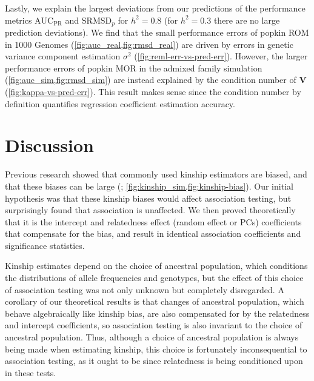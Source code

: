 \documentclass[11pt]{article}
\newcommand{\rmsd}{\text{SRMSD}_p}
\newcommand{\auc}{\text{AUC}_\text{PR}}
\begin{document}
\begin{linenumbers}
Lastly, we explain the largest deviations from our predictions of the performance metrics $\auc$ and $\rmsd$ for $h^2=0.8$ (for $h^2=0.3$ there are no large prediction deviations).
We find that the small performance errors of popkin ROM in 1000 Genomes (\cref{fig:auc_real,fig:rmsd_real}) are driven by errors in genetic variance component estimation $\sigma^2$ (\cref{fig:reml-err-vs-pred-err}).
However, the larger performance errors of popkin MOR in the admixed family simulation (\cref{fig:auc_sim,fig:rmsd_sim}) are instead explained by the condition number of $\mathbf{V}$ (\cref{fig:kappa-vs-pred-err}).
This result makes sense since the condition number by definition quantifies regression coefficient estimation accuracy.

\section{Discussion}

Previous research showed that commonly used kinship estimators are biased, and that these biases can be large (\citet{ochoa_estimating_2021}; \cref{fig:kinship_sim,fig:kinship-bias}).
Our initial hypothesis was that these kinship biases would affect association testing, but surprisingly found that association is unaffected.
We then proved theoretically that it is the intercept and relatedness effect (random effect or PCs) coefficients that compensate for the bias, and result in identical association coefficients and significance statistics.

Kinship estimates depend on the choice of ancestral population, which conditions the distributions of allele frequencies and genotypes, but the effect of this choice of association testing was not only unknown but completely disregarded.
A corollary of our theoretical results is that changes of ancestral population, which behave algebraically like kinship bias, are also compensated for by the relatedness and intercept coefficients, so association testing is also invariant to the choice of ancestral population.
Thus, although a choice of ancestral population is always being made when estimating kinship, this choice is fortunately inconsequential to association testing, as it ought to be since relatedness is being conditioned upon in these tests.


\end{linenumbers}
\end{document}
